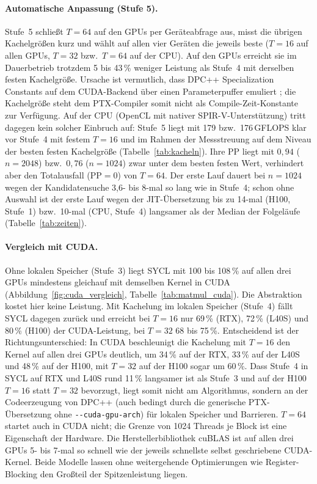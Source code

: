 \documentclass[12pt,a4paper]{article}
\begin{document}
\paragraph{Automatische Anpassung (Stufe 5).}
Stufe~5 schließt $T = 64$ auf den GPUs per Geräteabfrage aus, misst die übrigen
Kachelgrößen kurz und wählt auf allen vier Geräten die jeweils beste ($T = 16$
auf allen GPUs, $T = 32$ bzw.\ $T = 64$ auf der CPU). Auf den GPUs erreicht
sie im Dauerbetrieb trotzdem 5 bis 43\,\% weniger Leistung als Stufe~4 mit
derselben festen Kachelgröße. Ursache ist vermutlich, dass DPC++ Specialization
Constants auf dem CUDA-Backend über einen Parameterpuffer emuliert
\cite{dpcpp_spec_const}; die Kachelgröße steht dem PTX-Compiler somit nicht als
Compile-Zeit-Konstante zur Verfügung. Auf der CPU (OpenCL mit nativer
SPIR-V-Unterstützung) tritt dagegen kein solcher Einbruch auf: Stufe~5 liegt
mit 179 bzw.\ 176\,GFLOPS klar vor Stufe~4 mit festem $T = 16$ und im Rahmen
der Messstreuung auf dem Niveau der besten festen Kachelgröße
(Tabelle~\ref{tab:kacheln}). Ihre PP liegt mit $0{,}94$ ($n = 2048$) bzw.\
$0{,}76$ ($n = 1024$) zwar unter dem besten festen Wert, verhindert aber den
Totalausfall ($\text{PP} = 0$) von $T = 64$. Der erste Lauf dauert bei
$n = 1024$ wegen der Kandidatensuche 3,6- bis 8-mal so lang wie in Stufe~4;
schon ohne Auswahl ist der erste Lauf wegen der JIT-Übersetzung bis zu 14-mal
(H100, Stufe~1) bzw.\ 10-mal (CPU, Stufe~4) langsamer als der Median der
Folgeläufe (Tabelle~\ref{tab:zeiten}).

\paragraph{Vergleich mit CUDA.}
Ohne lokalen Speicher (Stufe~3) liegt SYCL mit 100 bis 108\,\% auf allen drei
GPUs mindestens gleichauf mit demselben Kernel in CUDA
(Abbildung~\ref{fig:cuda_vergleich}, Tabelle~\ref{tab:matmul_cuda}). Die
Abstraktion kostet hier keine Leistung. Mit Kachelung im lokalen Speicher
(Stufe~4) fällt SYCL dagegen zurück und erreicht bei $T = 16$ nur 69\,\% (RTX),
72\,\% (L40S) und 80\,\% (H100) der CUDA-Leistung, bei $T = 32$ 68 bis 75\,\%.
Entscheidend ist der Richtungsunterschied: In CUDA beschleunigt die Kachelung
mit $T = 16$ den Kernel auf allen drei GPUs deutlich, um 34\,\% auf der RTX,
33\,\% auf der L40S und 48\,\% auf der H100, mit $T = 32$ auf der H100 sogar um
60\,\%. Dass Stufe~4 in SYCL auf RTX und L40S rund 11\,\% langsamer ist als
Stufe~3 und auf der H100 $T = 16$ statt $T = 32$ bevorzugt, liegt somit nicht
am Algorithmus, sondern an der Codeerzeugung von DPC++ (auch bedingt durch die
generische PTX-Übersetzung ohne \texttt{-{}-cuda-gpu-arch}) für lokalen Speicher
und Barrieren. $T = 64$ startet auch in CUDA nicht; die Grenze von 1024 Threads
je Block ist eine Eigenschaft der Hardware. Die Herstellerbibliothek cuBLAS
\cite{nvidia_cublas} ist auf allen drei GPUs 5- bis 7-mal so schnell wie der
jeweils schnellste selbst geschriebene CUDA-Kernel. Beide Modelle lassen ohne
weitergehende Optimierungen wie Register-Blocking \cite{volkov2008gemm} den
Großteil der Spitzenleistung liegen.
\end{document}
